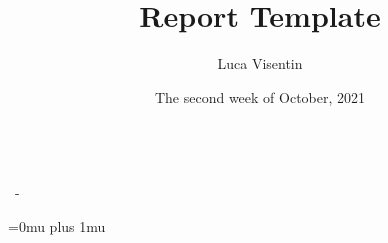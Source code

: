 \documentclass{article}
\title{\normalfont Report Template}
\author{Luca Visentin}
\date{The second week of October, 2021}
\makeatletter
\renewcommand\maketitle{
        {\raggedright %
        {\huge \bfseries \sffamily \@title }\\[2ex]
        {\large \@author~-~\@date}
        }} %
\newcommand{\printappendices}{
    \setcounter{figure}{0}
    \setcounter{section}{0}   
    \setcounter{table}{0}   
    \renewcommand\thefigure{\Alph{figure}}
    \renewcommand\thesection{Appendix \Alph{section}}
    \renewcommand\thetable{\Alph{table}}
    \appendix
    \newpage
    \addcontentsline{toc}{part}{Appendices}
    \part*{Appendices}
    
}
\makeatother
\begin{document}
\maketitle

\tableofcontents



\printglossaries

\Urlmuskip=0mu plus 1mu\relax %
\printbibliography

\end{document}
